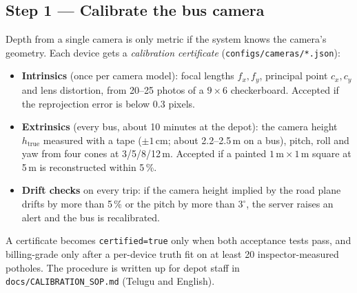 \documentclass[11pt,a4paper]{article}
\newcommand{\code}[1]{\texttt{\small #1}}
\begin{document}
\subsection{Step 1 --- Calibrate the bus camera}
Depth from a single camera is only metric if the system knows the camera's geometry. Each device gets a
\emph{calibration certificate} (\code{configs/cameras/*.json}):
\begin{itemize}
  \item \textbf{Intrinsics} (once per camera model): focal lengths $f_x, f_y$, principal point $c_x, c_y$ and lens
        distortion, from 20--25 photos of a $9\times6$ checkerboard. Accepted if the reprojection error is below
        0.3 pixels.
  \item \textbf{Extrinsics} (every bus, about 10 minutes at the depot): the camera height $h_{\text{true}}$ measured
        with a tape ($\pm1$\,cm; about 2.2--2.5\,m on a bus), pitch, roll and yaw from four cones at 3/5/8/12\,m.
        Accepted if a painted $1\,\text{m}\times1\,\text{m}$ square at 5\,m is reconstructed within 5\,\%.
  \item \textbf{Drift checks} on every trip: if the camera height implied by the road plane drifts by more than
        5\,\% or the pitch by more than $3^\circ$, the server raises an alert and the bus is recalibrated.
\end{itemize}
A certificate becomes \code{certified=true} only when both acceptance tests pass, and billing-grade only after a
per-device truth fit on at least 20 inspector-measured potholes. The procedure is written up for depot staff in
\code{docs/CALIBRATION\_SOP.md} (Telugu and English).

\end{document}
